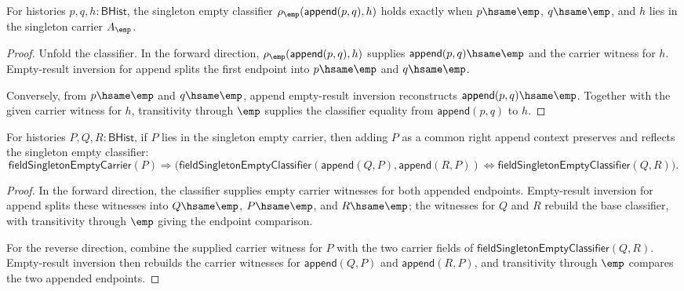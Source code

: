 \begin{theorem}
\label{thm:field-singleton-empty-classifier-append-split-empty}
For histories $p,q,h:\mathsf{BHist}$, the singleton empty classifier
$\rho_{\emp}(\mathsf{append}(p,q),h)$ holds exactly when
$p\hsame\emp$, $q\hsame\emp$, and $h$ lies in the singleton carrier
$A_{\emp}$.
\end{theorem}
\begin{proof}
Unfold the classifier. In the forward direction,
$\rho_{\emp}(\mathsf{append}(p,q),h)$ supplies
$\mathsf{append}(p,q)\hsame\emp$ and the carrier witness for $h$.
Empty-result inversion for append splits the first endpoint into
$p\hsame\emp$ and $q\hsame\emp$.

Conversely, from $p\hsame\emp$ and $q\hsame\emp$, append empty-result
inversion reconstructs $\mathsf{append}(p,q)\hsame\emp$. Together with the
given carrier witness for $h$, transitivity through $\emp$ supplies the
classifier equality from $\mathsf{append}(p,q)$ to $h$.
\end{proof}

\begin{theorem}
\label{thm:field-singleton-empty-classifier-append-right-cancel}
For histories $P,Q,R:\mathsf{BHist}$, if $P$ lies in the singleton empty
carrier, then adding $P$ as a common right append context preserves and
reflects the singleton empty classifier:
$$
\mathsf{fieldSingletonEmptyCarrier}(P)\Rightarrow
\bigl(
\mathsf{fieldSingletonEmptyClassifier}(\mathsf{append}(Q,P),\mathsf{append}(R,P))
\Longleftrightarrow
\mathsf{fieldSingletonEmptyClassifier}(Q,R)
\bigr).
$$
\end{theorem}
\begin{proof}
In the forward direction, the classifier supplies empty carrier witnesses for
both appended endpoints. Empty-result inversion for append splits these
witnesses into $Q\hsame\emp$, $P\hsame\emp$, and $R\hsame\emp$; the
witnesses for $Q$ and $R$ rebuild the base classifier, with transitivity
through $\emp$ giving the endpoint comparison.

For the reverse direction, combine the supplied carrier witness for $P$ with
the two carrier fields of $\mathsf{fieldSingletonEmptyClassifier}(Q,R)$.
Empty-result inversion then rebuilds the carrier witnesses for
$\mathsf{append}(Q,P)$ and $\mathsf{append}(R,P)$, and transitivity through
$\emp$ compares the two appended endpoints.
\end{proof}

